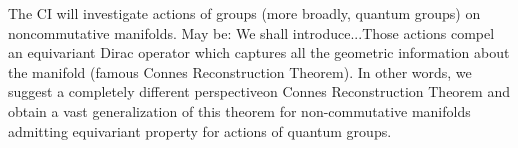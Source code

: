 \documentclass{article}
\begin{document}
The CI will investigate actions of groups (more broadly, quantum groups) on noncommutative manifolds. {\color{red} May be: We shall introduce...}Those actions compel an equivariant Dirac operator which captures all the geometric information about the manifold (famous Connes Reconstruction Theorem). In other words, we suggest a completely different perspectiveon Connes Reconstruction Theorem and obtain a vast generalization of this theorem for non-commutative manifolds admitting equivariant property for actions of quantum groups.


%
%
%
\end{document}
